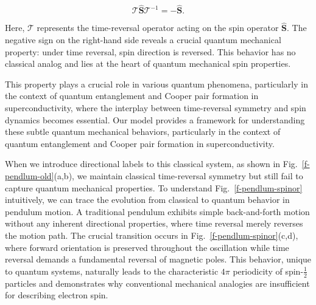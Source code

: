 \documentclass[%
 reprint,
 amsmath,amssymb,
 aps,
]{revtex4-1}
\numberwithin{equation}{section}%
\begin{document}
\begin{equation}
\mathcal{T}\hat{\boldsymbol{S}}\mathcal{T}^{-1} = -\hat{\boldsymbol{S}}.
\label{eq:time_reversal_spin}
\end{equation}

Here, $\mathcal{T}$ represents the time-reversal operator acting on the spin operator $\hat{\boldsymbol{S}}$. The negative sign on the right-hand side reveals a crucial quantum mechanical property: under time reversal, spin direction is reversed. This behavior has no classical analog and lies at the heart of quantum mechanical spin properties.

This property plays a crucial role in various quantum phenomena, particularly in the context of quantum entanglement and Cooper pair formation in superconductivity, where the interplay between time-reversal symmetry and spin dynamics becomes essential. Our model provides a framework for understanding these subtle quantum mechanical behaviors, particularly in the context of quantum entanglement and Cooper pair formation in superconductivity.

When we introduce directional labels to this classical system, as shown in Fig.~\ref{f-pendlum-old}(a,b), we maintain classical time-reversal symmetry but still fail to capture quantum mechanical properties. To understand Fig.~\ref{f-pendlum-spinor} intuitively, we can trace the evolution from classical to quantum behavior in pendulum motion. A traditional pendulum exhibits simple back-and-forth motion without any inherent directional properties, where time reversal merely reverses the motion path.  The crucial transition occurs in Fig.~\ref{f-pendlum-spinor}(c,d), where forward orientation is preserved throughout the oscillation while time reversal demands a fundamental reversal of magnetic poles. This behavior, unique to quantum systems, naturally leads to the characteristic $4\pi$ periodicity of spin-$\frac{1}{2}$ particles and demonstrates why conventional mechanical analogies are insufficient for describing electron spin.
\end{document}
